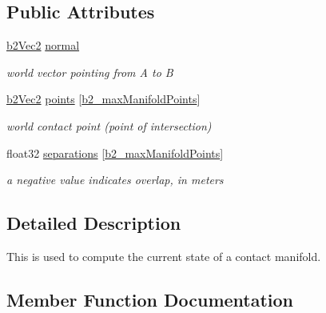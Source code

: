 \subsection*{Public Attributes}
\begin{DoxyCompactItemize}
\item 
\mbox{\label{structb2WorldManifold_acf8de61b73d9784d16f7d0e824ce44bf}} 
\hyperlink{structb2Vec2}{b2\+Vec2} \hyperlink{structb2WorldManifold_acf8de61b73d9784d16f7d0e824ce44bf}{normal}
\begin{DoxyCompactList}\small\item\em world vector pointing from A to B \end{DoxyCompactList}\item 
\mbox{\label{structb2WorldManifold_a3609f22f6b5bcc0444ba53ec1068f400}} 
\hyperlink{structb2Vec2}{b2\+Vec2} \hyperlink{structb2WorldManifold_a3609f22f6b5bcc0444ba53ec1068f400}{points} \mbox{[}\hyperlink{_2cocos2d_2external_2Box2D_2include_2Box2D_2Common_2b2Settings_8h_aa5f44cc9edf711433dea2b2ec94f3c42}{b2\+\_\+max\+Manifold\+Points}\mbox{]}
\begin{DoxyCompactList}\small\item\em world contact point (point of intersection) \end{DoxyCompactList}\item 
\mbox{\label{structb2WorldManifold_a4dfa21ad0492dc5e0439f01faf36c177}} 
float32 \hyperlink{structb2WorldManifold_a4dfa21ad0492dc5e0439f01faf36c177}{separations} \mbox{[}\hyperlink{_2cocos2d_2external_2Box2D_2include_2Box2D_2Common_2b2Settings_8h_aa5f44cc9edf711433dea2b2ec94f3c42}{b2\+\_\+max\+Manifold\+Points}\mbox{]}
\begin{DoxyCompactList}\small\item\em a negative value indicates overlap, in meters \end{DoxyCompactList}\end{DoxyCompactItemize}


\subsection{Detailed Description}
This is used to compute the current state of a contact manifold. 

\subsection{Member Function Documentation}
\mbox{\label{structb2WorldManifold_a896dd7e7d4d6f6a5bc69e19fbd6871bd}} 
